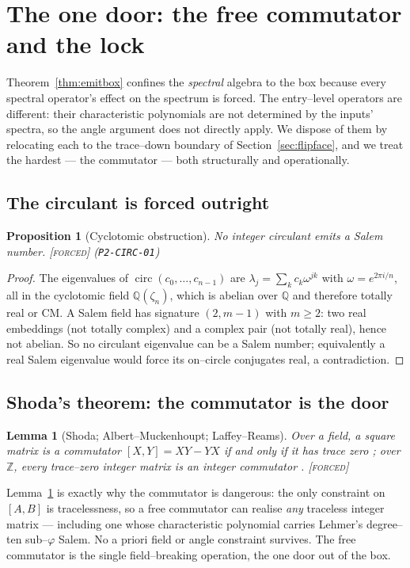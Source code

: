 \documentclass[11pt]{article}
\theoremstyle{plain}
\newtheorem{proposition}[theorem]{Proposition}
\newtheorem{lemma}[theorem]{Lemma}
\theoremstyle{definition}
\theoremstyle{remark}
\newcommand{\forced}{\textcolor{forcedc}{\textsc{[forced]}}}
\newcommand{\Q}{\mathbb{Q}}
\newcommand{\Z}{\mathbb{Z}}
\begin{document}
\section{The one door: the free commutator and the lock}\label{sec:door}

Theorem~\ref{thm:emitbox} confines the \emph{spectral} algebra to the box because every spectral operator's effect on the spectrum is forced. The entry--level operators are different: their characteristic polynomials are not determined by the inputs' spectra, so the angle argument does not directly apply. We dispose of them by relocating each to the trace--down boundary of Section~\ref{sec:flipface}, and we treat the hardest --- the commutator --- both structurally and operationally.

\subsection{The circulant is forced outright}
\begin{proposition}[Cyclotomic obstruction]\label{prop:circ}
No integer circulant emits a Salem number. \forced{} {\small(\texttt{P2-CIRC-01})}
\end{proposition}
\begin{proof}
The eigenvalues of $\operatorname{circ}(c_0,\dots,c_{n-1})$ are $\lambda_j=\sum_k c_k\omega^{jk}$ with $\omega=e^{2\pi i/n}$, all in the cyclotomic field $\Q(\zeta_n)$, which is abelian over $\Q$ and therefore totally real or CM. A Salem field has signature $(2,m-1)$ with $m\ge2$: two real embeddings (not totally complex) and a complex pair (not totally real), hence not abelian. So no circulant eigenvalue can be a Salem number; equivalently a real Salem eigenvalue would force its on--circle conjugates real, a contradiction.
\end{proof}

\subsection{Shoda's theorem: the commutator is the door}
\begin{lemma}[Shoda; Albert--Muckenhoupt; Laffey--Reams]\label{lem:shoda}
Over a field, a square matrix is a commutator $[X,Y]=XY-YX$ if and only if it has trace zero
\cite{Shoda1936}; over $\Z$, every trace--zero integer matrix is an integer commutator
\cite{AlbertMuckenhoupt,LaffeyReams}. \forced{}
\end{lemma}

Lemma~\ref{lem:shoda} is exactly why the commutator is dangerous: the only constraint on $[A,B]$ is tracelessness, so a free commutator can realise \emph{any} traceless integer matrix --- including one whose characteristic polynomial carries Lehmer's degree--ten sub--$\varphi$ Salem. No a priori field or angle constraint survives. The free commutator is the single field--breaking operation, the one door out of the box.
\end{document}

